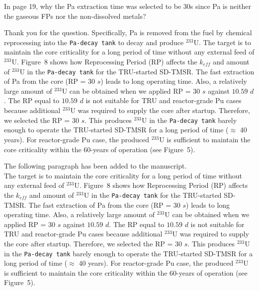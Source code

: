 \documentclass[answers,11pt]{exam}
\begin{document}
\begin{questions}
        \question In page 19, why the Pa extraction time was selected to be 30s since Pa is neither the gaseous FPs nor the non-dissolved metals?
        \begin{solution}
                  Thank you for the question. Specifically, Pa is removed from the fuel by chemical reprocessing into the \texttt{Pa-decay tank} to decay and produce $^{233}$U. The target is to maintain the core criticality for a long period of time without any external feed of $^{233}$U. Figure~8 shows how Reprocessing Period (RP) affects the $k_{eff}$ and amount of $^{233}$U in the \texttt{Pa-decay tank} for the TRU-started SD-TMSR. The fast extraction of Pa from the core (RP = $30$ $s$) leads to long operating time. Also, a relatively large amount of $^{233}$U can be obtained when we applied RP = $30$ $s$ against $10.59$ $d$. The RP equal to $10.59$ $d$ is not suitable for TRU and reactor-grade Pu cases because additional $^{233}$U was required to supply the core after startup. Therefore, we selected the RP = $30$ $s$. This produces $^{233}$U in the \texttt{Pa-decay tank} barely enough to operate the TRU-started SD-TMSR for a long period of time ($\approx$ 40 years). For reactor-grade Pu case, the produced $^{233}$U is sufficient to maintain the core criticality within the 60-years of operation (see Figure~5).
                  
                  The following paragraph has been added to the manuscript.\\
                  
                  The target is to maintain the core criticality for a long period of time without any external feed of $^{233}$U. Figure~8 shows how Reprocessing Period (RP) affects the $k_{eff}$ and amount of $^{233}$U in the \texttt{Pa-decay tank} for the TRU-started SD-TMSR. The fast extraction of Pa from the core (RP = $30$ $s$) leads to long operating time. Also, a relatively large amount of $^{233}$U can be obtained when we applied RP = $30$ $s$ against $10.59$ $d$. The RP equal to $10.59$ $d$ is not suitable for TRU and reactor-grade Pu cases because additional $^{233}$U was required to supply the core after startup. Therefore, we selected the RP = $30$ $s$. This produces $^{233}$U in the \texttt{Pa-decay tank} barely enough to operate the TRU-started SD-TMSR for a long period of time ($\approx$ 40 years). For reactor-grade Pu case, the produced $^{233}$U is sufficient to maintain the core criticality within the 60-years of operation (see Figure~5).
        \end{solution}


\end{questions}
\end{document}
